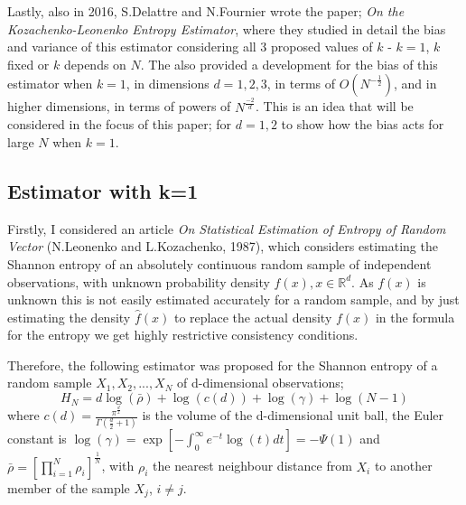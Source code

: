 \documentclass{report}
\begin{document}
Lastly, also in 2016, S.Delattre and N.Fournier wrote the paper; \textit{On the Kozachenko-Leonenko Entropy Estimator}, where they studied in detail the bias and variance of this estimator considering all 3 proposed values of $k$ - $k = 1$, $k$ fixed or $k$ depends on $N$. The also provided a development for the bias of this estimator when $k=1$, in dimensions $d=1,2,3$, in terms of $O(N^{-\frac{1}{2}})$, and in higher dimensions, in terms of powers of $N^{\frac{-2}{d}}$. This is an idea that will be considered in the focus of this paper; for $d=1,2$ to show how the bias acts for large $N$ when $k=1$.


\subsection{Estimator with k=1}

Firstly, I considered an article \textit{On Statistical Estimation of Entropy of Random Vector} (N.Leonenko and L.Kozachenko, 1987), which considers estimating the Shannon entropy of an absolutely continuous random sample of independent observations, with unknown probability density $f(x), x \in \mathbb{R}^{d}$. As $f(x)$ is unknown this is not easily estimated accurately for a random sample, and by just estimating the density $\hat{f}(x)$ to replace the actual density $f(x)$ in the formula for the entropy we get highly restrictive consistency conditions. 

Therefore, the following estimator was proposed for the Shannon entropy of a random sample $X_{1}, X_{2}, ..., X_{N}$ of d-dimensional observations;
\begin{equation}
H_{N} = d \log(\bar{\rho } ) + \log (c(d)) + \log (\gamma) + \log (N-1)
\end{equation}
where $c(d) = \frac{\pi^{\frac{d}{2}}}{\Gamma ( \frac{d}{2} + 1 )}$ is the volume of the d-dimensional unit ball, the Euler constant is $\log (\gamma) = \exp \left[ - \int_{0}^{\infty} e^{-t} \log(t) dt \right] = -\Psi(1)$ and $\bar{\rho} = \left[ \prod_{i=1}^{N} \rho_{i} \right]^{\frac{1}{N}}$, with $\rho_{i}$ the nearest neighbour distance from $X_{i}$ to another member of the sample $X_{j}$, $i \neq j$. 
\end{document}
